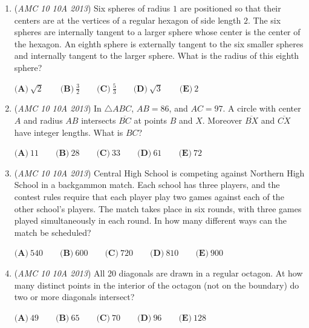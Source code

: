 \begin{enumerate}
 $\textbf{(A)}\ 720\qquad\textbf{(B)}\ 1296\qquad\textbf{(C)}\ 1728\qquad\textbf{(D)}\ 1925\qquad\textbf{(E)}\ 3850$


	\item (\textit{AMC 10 10A 2013}) Six spheres of radius $1$ are positioned so that their centers are at the vertices of a regular hexagon of side length $2$. The six spheres are internally tangent to a larger sphere whose center is the center of the hexagon.  An eighth sphere is externally tangent to the six smaller spheres and internally tangent to the larger sphere.  What is the radius of this eighth sphere?


 $\textbf{(A)}\ \sqrt2\qquad\textbf{(B)}\ \frac{3}{2}\qquad\textbf{(C)}\ \frac{5}{3}\qquad\textbf{(D)}\ \sqrt3\qquad\textbf{(E)}\ 2$


	\item (\textit{AMC 10 10A 2013}) In $\triangle ABC$, $AB = 86$, and $AC=97$.  A circle with center $A$ and radius $AB$ intersects $\overline{BC}$ at points $B$ and $X$.  Moreover $\overline{BX}$ and $\overline{CX}$ have integer lengths.  What is $BC$?


 $\textbf{(A)}\ 11\qquad\textbf{(B)}\ 28\qquad\textbf{(C)}\ 33\qquad\textbf{(D)}\ 61\qquad\textbf{(E)}\ 72$


	\item (\textit{AMC 10 10A 2013}) Central High School is competing against Northern High School in a backgammon match. Each school has three players, and the contest rules require that each player play two games against each of the other school's players. The match takes place in six rounds, with three games played simultaneously in each round. In how many different ways can the match be scheduled?


 $\textbf{(A)}\ 540\qquad\textbf{(B)}\ 600\qquad\textbf{(C)}\ 720\qquad\textbf{(D)}\ 810\qquad\textbf{(E)}\ 900$


	\item (\textit{AMC 10 10A 2013}) All 20 diagonals are drawn in a regular octagon. At how many distinct points in the interior
of the octagon (not on the boundary) do two or more diagonals intersect?


 $\textbf{(A)}\ 49\qquad\textbf{(B)}\ 65\qquad\textbf{(C)}\ 70\qquad\textbf{(D)}\ 96\qquad\textbf{(E)}\ 128$


\end{enumerate}